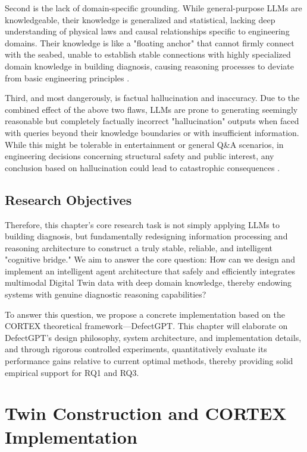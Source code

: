 Second is the lack of domain-specific grounding. While general-purpose LLMs are knowledgeable, their knowledge is generalized and statistical, lacking deep understanding of physical laws and causal relationships specific to engineering domains. Their knowledge is like a "floating anchor" that cannot firmly connect with the seabed, unable to establish stable connections with highly specialized domain knowledge in building diagnosis, causing reasoning processes to deviate from basic engineering principles \cite{harnad1990symbol}.

Third, and most dangerously, is factual hallucination and inaccuracy. Due to the combined effect of the above two flaws, LLMs are prone to generating seemingly reasonable but completely factually incorrect "hallucination" outputs when faced with queries beyond their knowledge boundaries or with insufficient information. While this might be tolerable in entertainment or general Q\&A scenarios, in engineering decisions concerning structural safety and public interest, any conclusion based on hallucination could lead to catastrophic consequences \cite{zhang2023siren}.

\subsection{Research Objectives}

Therefore, this chapter's core research task is not simply applying LLMs to building diagnosis, but fundamentally redesigning information processing and reasoning architecture to construct a truly stable, reliable, and intelligent "cognitive bridge." We aim to answer the core question: How can we design and implement an intelligent agent architecture that safely and efficiently integrates multimodal Digital Twin data with deep domain knowledge, thereby endowing systems with genuine diagnostic reasoning capabilities?

To answer this question, we propose a concrete implementation based on the CORTEX theoretical framework—DefectGPT. This chapter will elaborate on DefectGPT's design philosophy, system architecture, and implementation details, and through rigorous controlled experiments, quantitatively evaluate its performance gains relative to current optimal methods, thereby providing solid empirical support for RQ1 and RQ3.

\section{Twin Construction and CORTEX Implementation}

